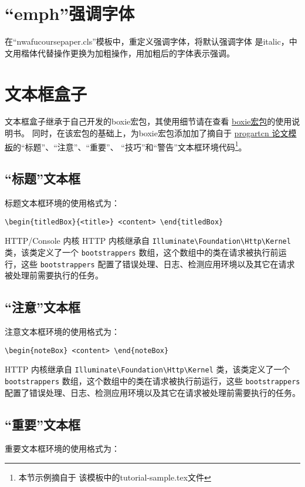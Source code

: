 \documentclass{nwafucoursepaper}
\begin{document}
\section{\enquote{emph}强调字体}
在\enquote{nwafucoursepaper.cls}模板中，重定义强调字体，将默认强调字体
是italic，中文用楷体代替操作更换为加粗操作，用加粗后的字体表示强调。
\section{文本框盒子}
文本框盒子继承于自己开发的boxie宏包，其使用细节请在\github{}查看
\href{https://github.com/registor/boxiesty}{boxie宏包}的使用说明书。
同时，在该宏包的基础上，为boxie宏包添加加了摘自于
\href{https://github.com/WisdomFusion/latex-templates/tree/master/progartcn}{progartcn
  论文模板}的\enquote{标题}、\enquote{注意}、\enquote{重要}、
\enquote{技巧}和\enquote{警告}文本框环境代码\footnote{本节示例摘自于
  该模板中的tutorial-sample.tex文件}。
\subsection{\enquote{标题}文本框}
标题文本框环境的使用格式为：

\verb|\begin{titledBox}{<title>} <content> \end{titledBox}|

\begin{titledBox}{HTTP/Console 内核}
  HTTP 内核继承自 \verb|Illuminate\Foundation\Http\Kernel| 类，该类定义了一个 \verb|bootstrappers| 数组，这个数组中的类在请求被执行前运行，这些 \verb|bootstrappers| 配置了错误处理、日志、检测应用环境以及其它在请求被处理前需要执行的任务。
\end{titledBox}
\subsection{\enquote{注意}文本框}
注意文本框环境的使用格式为：

\verb|\begin{noteBox} <content> \end{noteBox}|

\begin{noteBox}
  HTTP 内核继承自 \verb|Illuminate\Foundation\Http\Kernel| 类，该类定义了一个 \verb|bootstrappers| 数组，这个数组中的类在请求被执行前运行，这些 \verb|bootstrappers| 配置了错误处理、日志、检测应用环境以及其它在请求被处理前需要执行的任务。
\end{noteBox}

\subsection{\enquote{重要}文本框}
重要文本框环境的使用格式为：
\end{document}
